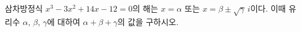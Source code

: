 삼차방정식 $x^3-3x^2+14x-12=0$의 해는 $x=\alpha$ 또는 $x=\beta\pm\sqrt{\gamma}\,i$이다. 이때 유리수 $\alpha$, $\beta$, $\gamma$에 대하여 $\alpha+\beta+\gamma$의 값을 구하시오.
